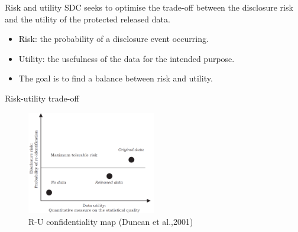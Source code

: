 \documentclass[
  ignorenonframetext,
  aspectratio=169,
]{beamer}
\begin{document}
\begin{frame}{Risk and utility}
\protect\hypertarget{risk-and-utility}{}
SDC seeks to optimise the trade-off between the disclosure risk and the
utility of the protected released data.

\begin{itemize}
\item
  Risk: the probability of a disclosure event occurring.
\item
  Utility: the usefulness of the data for the intended purpose.
\item
  The goal is to find a balance between risk and utility.
\end{itemize}
\end{frame}

\begin{frame}{Risk-utility trade-off}
\protect\hypertarget{risk-utility-trade-off}{}
\begin{figure}

{\centering \includegraphics[width=0.5\textwidth,height=\textheight]{gallery/R-U confidentiality map.png}

}

\caption{R-U confidentiality map (Duncan et al.,2001)}

\end{figure}
\end{frame}
\end{document}
